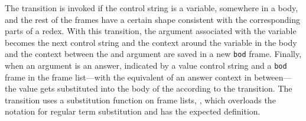 \documentclass[runningheads,a4paper]{llncs}
\begin{document}
The \lookupvarck transition is invoked if the control string is a variable,
 somewhere in a  body, and the rest of the frames have a certain shape
 consistent with the corresponding parts of a \betaneednr redex. With this
 transition, the argument associated with the variable becomes the next control
 string and the context around the variable in the  body and the
 context between the  and argument are saved in a new \texttt{bod}
 frame. Finally, when an argument is an answer, indicated by a value control
 string and a \texttt{bod} frame in the frame list---with the equivalent of an
 answer context in between---the value gets substituted into the body of the
  according to the \betaneedck transition. The \betaneedck transition
 uses a substitution function on frame lists, , which
 overloads the notation for regular term substitution and has the expected
 definition.
\end{document}
